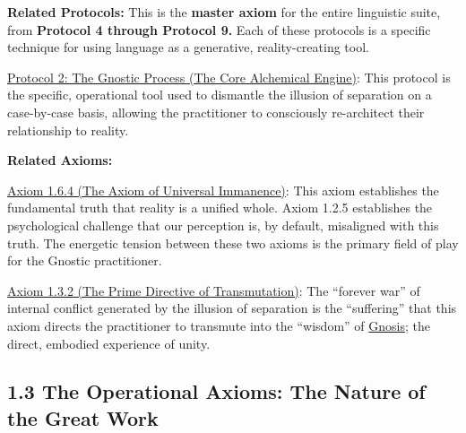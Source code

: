 \documentclass{article}
\begin{document}
\begin{nobullet}
    \item \textbf{Related Protocols:} This is the \textbf{master axiom} for the entire linguistic suite, from \textbf{Protocol 4 through Protocol 9.} Each of these protocols is a specific technique for using language as a generative, reality-creating tool.
        \begin{nobullet}
            \item \hyperref[protocol_2_the_gnostic_process_the_core_alchemical_engine]{Protocol 2: The Gnostic Process (The Core Alchemical Engine)}: This protocol is the specific, operational tool used to dismantle the illusion of separation on a case-by-case basis, allowing the practitioner to consciously re-architect their relationship to reality.
        \end{nobullet}

    \item \textbf{Related Axioms:}
        \begin{nobullet}
            \item \hyperref[axiom_1_6_4_the_the_axiom_of_universal_immanence]{Axiom 1.6.4 (The Axiom of Universal Immanence)}: This axiom establishes the fundamental truth that reality is a unified whole. Axiom 1.2.5 establishes the psychological challenge that our perception is, by default, misaligned with this truth. The energetic tension between these two axioms is the primary field of play for the Gnostic practitioner.
            \item \hyperref[axiom_1_3_2_the_prime_directive_of_transmutation]{Axiom 1.3.2 (The Prime Directive of Transmutation)}: The ``forever war'' of internal conflict generated by the illusion of separation is the ``suffering'' that this axiom directs the practitioner to transmute into the ``wisdom'' of \hyperlink{gloss:gnosis}{Gnosis}; the direct, embodied experience of unity.
        \end{nobullet}

\end{nobullet}




\subsection*{1.3 The Operational Axioms: The Nature of the Great Work}
\end{document}
